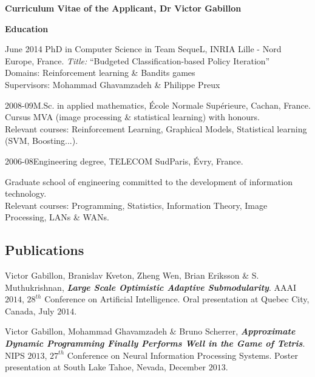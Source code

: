 
 \begin{center} \textbf{Curriculum Vitae of the Applicant, Dr Victor Gabillon}  \end{center}
 
\noindent\textbf{Education}\\[-.4cm]\noindent\makebox[\linewidth]{\rule{\columnwidth}{0.4pt}}
\begin{vitem}{June 2014 }{PhD in Computer Science}
 in Team SequeL, INRIA Lille - Nord Europe, France.
\textit{Title:} ``Budgeted Classification-based Policy Iteration''\\
Domains: Reinforcement learning \& Bandits games\\
Supervisors: Mohammad Ghavamzadeh \& Philippe Preux

 \end{vitem}


 \begin{vitem}{2008-09}{M.Sc. in applied mathematics, École Normale Supérieure, Cachan, France.}
Cursus MVA (image processing \& statistical learning) with honours.\\
Relevant courses: Reinforcement Learning, Graphical Models, Statistical learning (SVM, Boosting...).
 \end{vitem}

 \begin{vitem}{2006-08}{Engineering degree, TELECOM SudParis, Évry, France.}

Graduate school of engineering committed to the development of information technology. \\
Relevant courses: Programming, Statistics, Information Theory, Image Processing, LANs \& WANs.
 \end{vitem}
 
\subsection{Publications}
 Victor Gabillon, Branislav Kveton, Zheng Wen, Brian Eriksson $\&$ S. Muthukrishnan, \textbf{\emph{Large Scale Optimistic Adaptive Submodularity}}.
AAAI $2014$, $28^{th}$ Conference on Artificial Intelligence.
Oral presentation at Quebec City, Canada, July $2014$.


 Victor Gabillon, Mohammad Ghavamzadeh $\&$ Bruno Scherrer, 
\textbf{\emph{Approximate Dynamic Programming Finally Performs Well in the Game of Tetris}}.
NIPS $2013$, $27^{th}$ Conference on Neural Information Processing Systems.
Poster presentation at South Lake Tahoe, Nevada, December $2013$.


